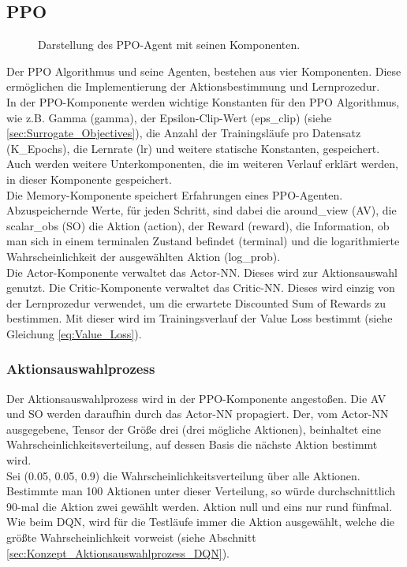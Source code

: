 \subsection{PPO} \label{sec:Konzept_PPO}
\begin{figure}[H]
	\centering
	\def\svgscale{0.18}
	
	\caption[PPO-Agent]{Darstellung des PPO-Agent mit seinen Komponenten.}
	\label{fig:PPO-Agent}
\end{figure}
Der PPO Algorithmus und seine Agenten, bestehen aus vier Komponenten. Diese ermöglichen die Implementierung der Aktionsbestimmung und Lernprozedur.\\
In der PPO-Komponente werden wichtige Konstanten für den PPO Algorithmus, wie z.B. Gamma (gamma), der Epsilon-Clip-Wert (eps\_clip) (siehe \ref{sec:Surrogate_Objectives}), die Anzahl der Trainingsläufe pro Datensatz (K\_Epochs), die Lernrate (lr) und weitere statische Konstanten, gespeichert. Auch werden weitere Unterkomponenten, die im weiteren Verlauf erklärt werden, in dieser Komponente gespeichert.\\
Die Memory-Komponente speichert Erfahrungen eines PPO-Agenten. Abzuspeichernde Werte, für jeden Schritt, sind dabei die around\_view (AV), die scalar\_obs (SO) die Aktion (action), der Reward (reward), die Information, ob man sich in einem terminalen Zustand befindet (terminal) und die logarithmierte Wahrscheinlichkeit der ausgewählten Aktion (log\_prob).\\
Die Actor-Komponente verwaltet das Actor-NN. Dieses wird zur Aktionsauswahl genutzt.
Die Critic-Komponente verwaltet das Critic-NN. Dieses wird einzig von der Lernprozedur verwendet, um die erwartete Discounted Sum of Rewards zu bestimmen. Mit dieser wird im Trainingsverlauf der Value Loss bestimmt (siehe Gleichung \ref{eq:Value_Loss}).

\subsubsection{Aktionsauswahlprozess} \label{sec:Konzept_Aktionsauswahlprozess_PPO}
Der Aktionsauswahlprozess wird in der PPO-Komponente angestoßen. Die AV und SO werden daraufhin durch das Actor-NN propagiert. Der, vom Actor-NN ausgegebene, Tensor der Größe drei (drei mögliche Aktionen), beinhaltet eine Wahrscheinlichkeitsverteilung, auf dessen Basis die nächste Aktion bestimmt wird.\\
Sei (0.05, 0.05, 0.9) die Wahrscheinlichkeitsverteilung über alle Aktionen. Bestimmte man 100 Aktionen unter dieser Verteilung, so würde durchschnittlich 90-mal die Aktion zwei gewählt werden. Aktion null und eins nur rund fünfmal.\\
Wie beim DQN, wird für die Testläufe immer die Aktion ausgewählt, welche die größte Wahrscheinlichkeit vorweist (siehe Abschnitt \ref{sec:Konzept_Aktionsauswahlprozess_DQN}).

